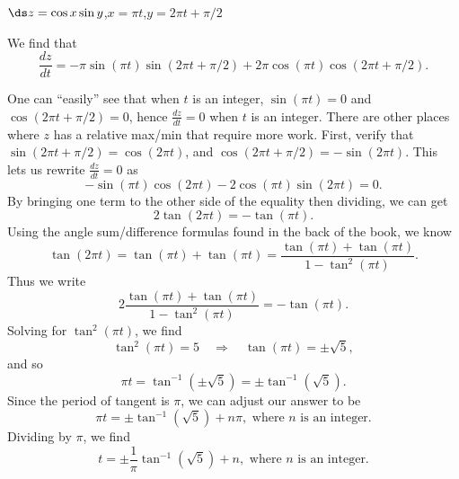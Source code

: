 {$\ds z=\cos x\sin y$,\qquad $x=\pi t$,\qquad $y=2\pi t+\pi/2$
}
{We find that $$\frac{dz}{dt} = -\pi\sin(\pi t)\sin(2\pi t+\pi/2)+2\pi\cos(\pi t)\cos(2\pi t+\pi/2).$$

One can ``easily'' see that when $t$ is an integer, $\sin(\pi t) =0$ and $\cos(2\pi t+\pi/2)=0$, hence $\frac{dz}{dt}=0$ when $t$ is an integer. There are other places where $z$ has a relative max/min that require more work. First, verify that $\sin(2\pi t+\pi/2) = \cos(2\pi t)$, and $\cos(2\pi t+\pi/2) = -\sin(2\pi t)$. This lets us rewrite $\frac{dz}{dt} = 0$ as
$$-\sin(\pi t)\cos(2\pi t)-2\cos(\pi t)\sin(2\pi t)=0.$$
By bringing one term to the other side of the equality then dividing, we can get
$$2\tan(2\pi t) = -\tan(\pi t).$$
Using the angle sum/difference formulas found in the back of the book, we know 
$$\tan(2\pi t) = \tan(\pi t)+\tan(\pi t) = \frac{\tan(\pi t)+\tan(\pi t)}{1-\tan^2(\pi t)}.$$
Thus we write
$$2\frac{\tan(\pi t)+\tan(\pi t)}{1-\tan^2(\pi t)} = -\tan(\pi t).$$
Solving for $\tan^2(\pi t)$, we find
$$\tan^2(\pi t) = 5 \quad \Rightarrow \quad \tan(\pi t) = \pm\sqrt{5},$$ and so
$$\pi t = \tan^{-1}(\pm\sqrt{5}) = \pm\tan^{-1}(\sqrt{5}).$$
Since the period of tangent is $\pi$, we can adjust our answer to be
$$\pi t = \pm\tan^{-1}(\sqrt{5})+ n\pi,\text{ where $n$ is an integer.}$$
Dividing by $\pi$, we find 
$$t = \pm\frac1\pi\tan^{-1}(\sqrt{5})+ n,\text{ where $n$ is an integer.}$$

}
